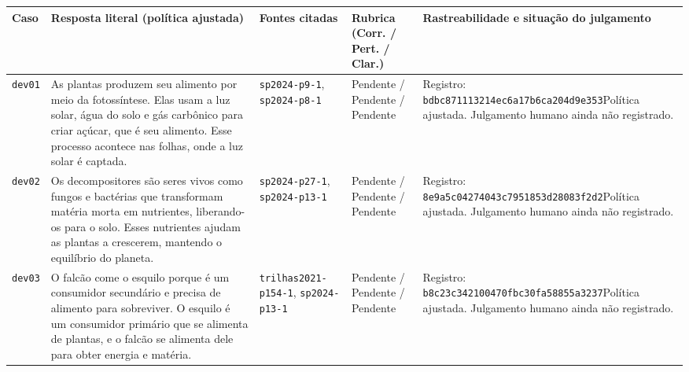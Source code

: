\begin{tabularx}{\textwidth}{L{1.0cm} Y L{2.45cm} L{2.0cm} L{3.0cm}}
\toprule
\textbf{Caso} & \textbf{Resposta literal (política ajustada)} & \textbf{Fontes citadas} & \textbf{Rubrica (Corr. / Pert. / Clar.)} & \textbf{Rastreabilidade e situação do julgamento} \\
\midrule
\texttt{dev01} & As plantas produzem seu alimento por meio da fotossíntese. Elas usam a luz solar, água do solo e gás carbônico para criar açúcar, que é seu alimento. Esse processo acontece nas folhas, onde a luz solar é captada. & \nolinkurl{sp2024-p9-1}, \nolinkurl{sp2024-p8-1} & Pendente / Pendente / Pendente & Registro: \texttt{bdbc871113214ec6}\newline\texttt{a17b6ca204d9e353}\newline Política ajustada. Julgamento humano ainda não registrado. \\
\addlinespace[3pt]
\texttt{dev02} & Os decompositores são seres vivos como fungos e bactérias que transformam matéria morta em nutrientes, liberando-os para o solo. Esses nutrientes ajudam as plantas a crescerem, mantendo o equilíbrio do planeta. & \nolinkurl{sp2024-p27-1}, \nolinkurl{sp2024-p13-1} & Pendente / Pendente / Pendente & Registro: \texttt{8e9a5c04274043c7}\newline\texttt{951853d28083f2d2}\newline Política ajustada. Julgamento humano ainda não registrado. \\
\addlinespace[3pt]
\texttt{dev03} & O falcão come o esquilo porque é um consumidor secundário e precisa de alimento para sobreviver. O esquilo é um consumidor primário que se alimenta de plantas, e o falcão se alimenta dele para obter energia e matéria. & \nolinkurl{trilhas2021-p154-1}, \nolinkurl{sp2024-p13-1} & Pendente / Pendente / Pendente & Registro: \texttt{b8c23c342100470f}\newline\texttt{bc30fa58855a3237}\newline Política ajustada. Julgamento humano ainda não registrado. \\
\bottomrule
\end{tabularx}
